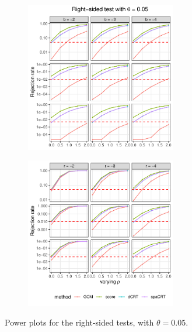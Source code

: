 \documentclass[12pt]{article}
\theoremstyle{definition}
\begin{document}
\begin{figure}
  \centering
  \begin{subfigure}{\textwidth}
    \centering
    \includegraphics[width=0.72\textwidth]{figures-and-tables/simulation/power/plot-bin-NB-normal-B-50000-n-5000-5e3-n5-n5-disp-5e-2-power-fixed-gamma-RIGHT.pdf}
  \end{subfigure}

  \begin{subfigure}{\textwidth}
    \centering
    \includegraphics[width=0.72\textwidth]{figures-and-tables/simulation/power/plot-bin-NB-normal-B-50000-n-5000-5e3-n5-n5-disp-5e-2-power-fixed-beta-RIGHT.pdf}
  \end{subfigure}

  \caption{Power plots for the right-sided tests, with $\theta = 0.05$.}
  \label{fig:simulation-power-RIGHT-0.05}
\end{figure}
\end{document}
